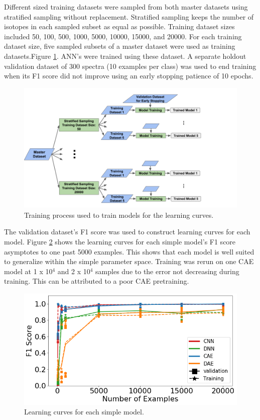 Different sized training datasets were sampled from both master datasets using stratified sampling without replacement. Stratified sampling keeps the number of isotopes in each sampled subset as equal as possible. Training dataset sizes included 50, 100, 500, 1000, 5000, 10000, 15000, and 20000. For each training dataset size, five sampled subsets of a master dataset were used as training datasets.Figure \ref{fig:learning_curve_training_diagram}. ANN's were trained using these dataset. A separate holdout validation dataset of 300 spectra (10 examples per class) was used to end training when its F1 score did not improve using an early stopping patience of 10 epochs.

\begin{figure}[H]
	\centering
	\includegraphics[trim=0 0 0 0,clip,width=1.0\linewidth]{images/learning_curve_training_diagram}
	\caption{Training process used to train models for the learning curves.}
	\label{fig:learning_curve_training_diagram}
\end{figure}

The validation dataset's F1 score was used to construct learning curves for each model. Figure \ref{fig:learning_curves_easy} shows the learning curves for each simple model's F1 score asymptotes to one past 5000 examples. This shows that each model is well suited to generalize within the simple parameter space. Training was rerun on one CAE model at 1 x 10$^{4}$ and 2 x 10$^{4}$ samples due to the error not decreasing during training. This can be attributed to a poor CAE pretraining.


\begin{figure}[H]
	\centering
	\includegraphics[width=0.9\linewidth]{images/learning_curves_easy}
	\caption{Learning curves for each simple model.}
	\label{fig:learning_curves_easy}
\end{figure}


